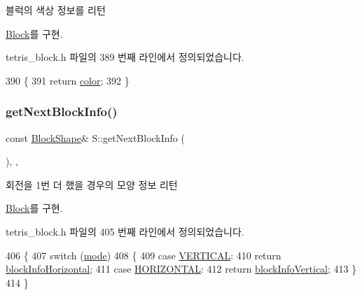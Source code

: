 블럭의 색상 정보를 리턴 



\mbox{\hyperlink{class_block_af10efef648f21dc708e42e149cd6fbcf}{Block}}를 구현.



tetris\+\_\+block.\+h 파일의 389 번째 라인에서 정의되었습니다.


\begin{DoxyCode}
390     \{
391         \textcolor{keywordflow}{return} \mbox{\hyperlink{class_s_a21faa1a841e2e11d5b9853bdfd0583df}{color}};
392     \}
\end{DoxyCode}
\mbox{\label{class_s_a48ef6d5f37afe48b14ea11fe00537c5e}} 
\subsubsection{\texorpdfstring{get\+Next\+Block\+Info()}{getNextBlockInfo()}}
{\footnotesize\ttfamily const \mbox{\hyperlink{class_block_aca5d951639f113e2ebd7856209d6b9ab}{Block\+Shape}}\& S\+::get\+Next\+Block\+Info (\begin{DoxyParamCaption}{ }\end{DoxyParamCaption})\hspace{0.3cm}{\ttfamily [inline]}, {\ttfamily [override]}, {\ttfamily [virtual]}}



회전을 1번 더 했을 경우의 모양 정보 리턴 



\mbox{\hyperlink{class_block_a654da164e0493be9de6f2f2334bc73e8}{Block}}를 구현.



tetris\+\_\+block.\+h 파일의 405 번째 라인에서 정의되었습니다.


\begin{DoxyCode}
406     \{
407         \textcolor{keywordflow}{switch} (\mbox{\hyperlink{class_s_a0a3c150f9afbfe65a5558d947b999776}{mode}})
408         \{
409         \textcolor{keywordflow}{case} \mbox{\hyperlink{class_block_a33a96023993478ad4b52426188454765a76628d7877667ccb2f6e549b89466a4a}{VERTICAL}}:
410             \textcolor{keywordflow}{return} \mbox{\hyperlink{class_s_ac96253e642b4d209abc7ea47aa687999}{blockInfoHorizontal}};
411         \textcolor{keywordflow}{case} \mbox{\hyperlink{class_block_a33a96023993478ad4b52426188454765a883bda1b4a0cb6d25d8b3c3465f0cfef}{HORIZONTAL}}:
412             \textcolor{keywordflow}{return} \mbox{\hyperlink{class_s_a4dfa7559187c41616256612400bcaab7}{blockInfoVertical}};
413         \}
414     \}
\end{DoxyCode}
\mbox{\label{class_s_a9d968087a1d499416a0ce91cce3c8f9f}} 
